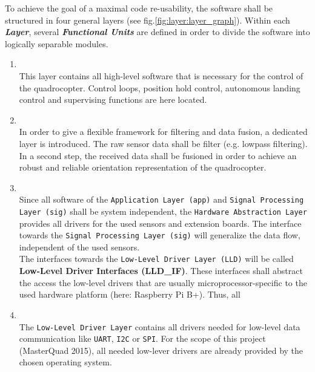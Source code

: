 To achieve the goal of a maximal code re-usability, the software shall be structured in four general layers (see fig.\ref{fig:layer:layer_graph}). Within each \textbf{\textit{Layer}}, several \textbf{\textit{Functional Units}} are defined in order to divide the software into logically separable modules.
\begin{enumerate}
	\item {}\\
				This layer contains all high-level software that is necessary for the control of the quadrocopter. Control loops, position hold control, autonomous landing control and supervising functions are here located.
	\item {}\\
				In order to give a flexible framework for filtering and data fusion, a dedicated layer is introduced. The raw sensor data shall be filter (e.g. lowpass filtering). In a second step, the received data shall be fusioned in order to achieve an robust and reliable orientation representation of the quadrocopter.
	\item {}\\
				Since all software of the \texttt{Application Layer (app)} and \texttt{Signal Processing Layer (sig)} shall be system independent, the \texttt{Hardware Abstraction Layer} provides all drivers for the used sensors and extension boards. The interface towards the \texttt{Signal Processing Layer (sig)} will generalize the data flow, independent of the used sensors.\\
				The interfaces towards the \texttt{Low-Level Driver Layer (LLD)} will be called \textbf{Low-Level Driver Interfaces (LLD\_IF)}. These interfaces shall abstract the access the low-level drivers that are usually microprocessor-specific to the used hardware platform (here: Raspberry Pi B+). Thus, all
	\item {}\\
				The \texttt{Low-Level Driver Layer} contains all drivers needed for low-level data communication like \texttt{UART}, \texttt{I2C} or \texttt{SPI}. For the scope of this project (MasterQuad 2015), all needed low-lever drivers are already provided by the chosen operating system.
\end{enumerate}

